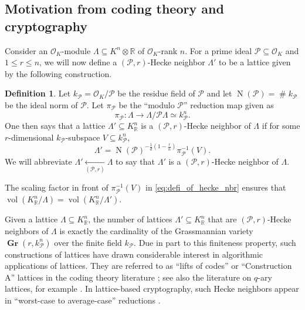 \documentclass{amsart}
\theoremstyle{definition}
\newtheorem{definition}[theorem]{Definition}
\theoremstyle{remark}
\newcommand{\OK}{\mathcal{O}_K}
\newcommand{\KR}{K_\mathbb{R}}
\newcommand{\hecke}[2]{ \underset{( #1, #2 )}{\leftarrow} }
\DeclareMathOperator{\vol}{vol}
\DeclareMathOperator{\card}{\texttt{\#}}
\DeclareMathOperator{\N}{N}
\DeclareMathOperator{\Gr}{\mathbf{Gr}}
\begin{document}
\subsection{Motivation from coding theory and cryptography}



Consider an $\OK$-module $\Lambda \subseteq K^{n} \otimes \mathbb{R}$ of $\OK$-rank $n$.
For a prime ideal $\mathcal{P} \subseteq \OK$ and $1 \leq r \leq n$, we will now define a $(\mathcal{P},r)$-Hecke neighbor $\Lambda'$ to be a lattice given by the following construction. 

\begin{definition}
    \label{de:heckenhbr}
    Let $k_{\mathcal{P}} = \OK/\mathcal{P}$ be the residue field 
    of $\mathcal{P}$ and let $\N(\mathcal{P}) = \card k_{\mathcal{P}}$ be the ideal norm of $\mathcal{P}$.
    Let $\pi_{\mathcal{P}}$ be the ``modulo $\mathcal{P}$'' reduction map given as
    \begin{equation}
        \pi_{\mathcal{P}}:\Lambda \rightarrow \Lambda/\mathcal{P}\Lambda \simeq  k_{\mathcal{P}}^{n}.
        \label{eq:modp}
    \end{equation}
    One then says that a lattice $\Lambda' \subseteq \KR^{n}$ is a $(\mathcal{P},r)$-Hecke neighbor of $\Lambda$ if
    for some $r$-dimensional $k_{\mathcal{P}}$-subspace $V \subseteq k_{\mathcal{P}}^{n}$,
    \begin{equation}
        \Lambda'= \N(\mathcal{P})^{- \tfrac{1}{d}\left(1-\tfrac{r}{n}\right)} \pi_{\mathcal{P}}^{-1}(V).
        \label{eq:defi_of_hecke_nbr}
    \end{equation}
    We will abbreviate $ \Lambda' \hecke{\mathcal{P}}{r} \Lambda$ to say that $\Lambda'$ is a $(\mathcal{P},r)$-Hecke neighbor of $\Lambda$.
\end{definition}

The scaling factor in front of $\pi_{\mathcal{P}}^{-1}(V)$ in \cref{eq:defi_of_hecke_nbr}
ensures that $\vol( \KR^{n}/\Lambda) = \vol( \KR^{n}/\Lambda')$.


Given a lattice $\Lambda \subseteq \KR^{n}$, the number of lattices $\Lambda' \subseteq \KR^{n}$ that are $(\mathcal{P},r)$-Hecke neighbors of $\Lambda$ is exactly the cardinality of the Grassmannian variety $\Gr(r,k_{\mathcal{P}}^{n})$ over the finite field $k_{\mathcal{P}}$.
Due in part to this finiteness property, such constructions of lattices have drawn considerable interest in algorithmic applications of lattices.
They are referred to as ``lifts of codes'' \cite{GS21}
or ``Construction A'' lattices in the coding theory literature \cite{CS,VKO14}; 
see also the literature on $q$-ary lattices, for example \cite{C18}.
In lattice-based cryptography, such Hecke neighbors appear in ``worst-case to average-case'' reductions \cite{AD15}.
\end{document}
